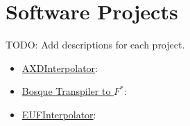 \section{Software Projects}

TODO: Add descriptions for each project.

\begin{itemize}
\item
  \href{https://github.com/typesAreSpaces/AXDInterpolator}{AXDInterpolator}:
\item
  \href{https://github.com/typesAreSpaces/BosqueLanguage/tree/fstar-implementation/ref_impl}{Bosque
  Transpiler to $F^{*}$}:
\item
  \href{https://github.com/typesAreSpaces/EUFInterpolator}{EUFInterpolator}:
\end{itemize}